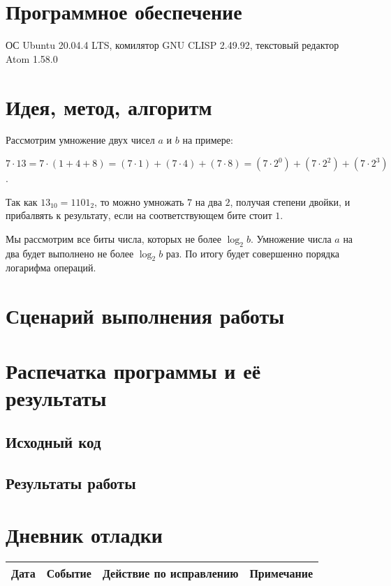 \documentclass[12pt]{article}
\begin{document}
\section{Программное обеспечение}
ОС Ubuntu 20.04.4 LTS, комилятор GNU CLISP 2.49.92, текстовый редактор Atom 1.58.0

\pagebreak
\section{Идея, метод, алгоритм}
Рассмотрим умножение двух чисел $a$ и $b$ на примере:

$7 \cdot 13 = 7 \cdot (1 + 4 + 8) = (7 \cdot 1) + (7 \cdot 4) + (7 \cdot 8) = (7 \cdot {2 ^ 0}) + (7 \cdot {2 ^ 2}) + (7 \cdot {2 ^ 3})$.

Так как ${13}_{10} = {1101}_{2}$, то можно умножать $7$ на два $2$, получая степени двойки, и прибалвять к результату, если на соответствующем бите стоит $1$.

Мы рассмотрим все биты числа, которых не более $\log_2{b}$. Умножение числа $a$ на два будет выполнено не более $\log_2{b}$ раз. По итогу будет совершенно порядка логарифма операций.

\section{Сценарий выполнения работы}

\section{Распечатка программы и её результаты}

\subsection{Исходный код}


\pagebreak
\subsection{Результаты работы}


\pagebreak
\section{Дневник отладки}
\begin{tabular}{|p{50pt}|p{80pt}|p{140pt}|p{140pt}|}
\hline
Дата & Событие & Действие по исправлению & Примечание \\
\hline
\end{tabular}
\end{document}
